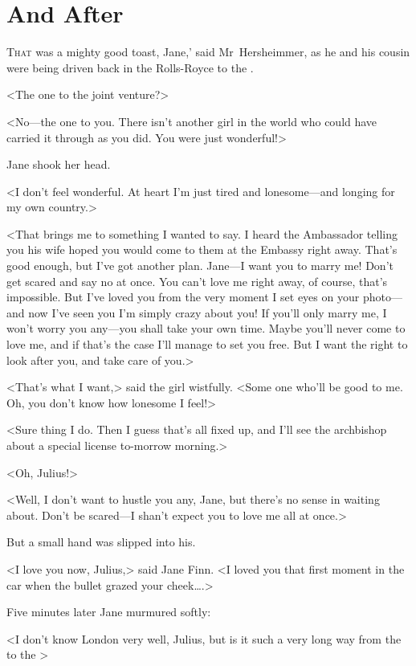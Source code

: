 \chapter{And After} 

 \lettrine[ante=`]{T}{hat}  was a mighty good toast, Jane,' said Mr~Hersheimmer, as he and his cousin were being driven back in the Rolls-Royce to the .

\zz
<The one to the joint venture?>

<No—the one to you. There isn't another girl in the world who could have carried it through as you did. You were just wonderful!>

Jane shook her head.

<I don't feel wonderful. At heart I'm just tired and lonesome—and longing for my own country.>

<That brings me to something I wanted to say. I heard the Ambassador telling you his wife hoped you would come to them at the Embassy right away. That's good enough, but I've got another plan. Jane—I want you to marry me! Don't get scared and say no at once. You can't love me right away, of course, that's impossible. But I've loved you from the very moment I set eyes on your photo—and now I've seen you I'm simply crazy about you! If you'll only marry me, I won't worry you any—you shall take your own time. Maybe you'll never come to love me, and if that's the case I'll manage to set you free. But I want the right to look after you, and take care of you.>

<That's what I want,> said the girl wistfully. <Some one who'll be good to me. Oh, you don't know how lonesome I feel!>

<Sure thing I do. Then I guess that's all fixed up, and I'll see the archbishop about a special license to-morrow morning.>

<Oh, Julius!>

<Well, I don't want to hustle you any, Jane, but there's no sense in waiting about. Don't be scared—I shan't expect you to love me all at once.>

But a small hand was slipped into his.

<I love you now, Julius,> said Jane Finn. <I loved you that first moment in the car when the bullet grazed your cheek\dots.>

Five minutes later Jane murmured softly:

<I don't know London very well, Julius, but is it such a very long way from the  to the >

